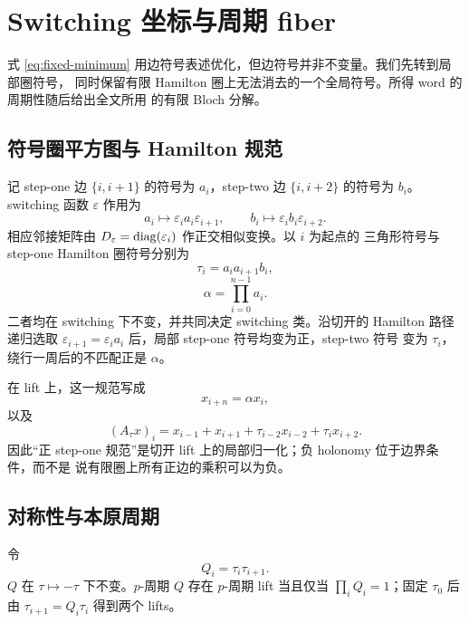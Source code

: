 \section{Switching 坐标与周期 fiber}
\label{sec:gauge}

式 \eqref{eq:fixed-minimum} 用边符号表述优化，但边符号并非不变量。我们先转到局部圈符号，
同时保留有限 Hamilton 圈上无法消去的一个全局符号。所得 word 的周期性随后给出全文所用
的有限 Bloch 分解。

\subsection{符号圈平方图与 Hamilton 规范}

记 step-one 边 $\{i,i+1\}$ 的符号为 $a_i$，step-two 边 $\{i,i+2\}$ 的符号为
$b_i$。switching 函数 $\varepsilon$ 作用为
\[
 a_i\mapsto\varepsilon_i a_i\varepsilon_{i+1},\qquad
 b_i\mapsto\varepsilon_i b_i\varepsilon_{i+2}.
\]
相应邻接矩阵由 $D_\varepsilon=\operatorname{diag}(\varepsilon_i)$ 作正交相似变换。以 $i$ 为起点的
三角形符号与 step-one Hamilton 圈符号分别为
\begin{equation}
 \tau_i=a_ia_{i+1}b_i,
 \label{eq:triangle-flux}
\end{equation}
\begin{equation}
 \alpha=\prod_{i=0}^{n-1}a_i.
 \label{eq:ham-holonomy}
\end{equation}
二者均在 switching 下不变，并共同决定 switching 类。沿切开的 Hamilton 路径递归选取
$\varepsilon_{i+1}=\varepsilon_i a_i$ 后，局部 step-one 符号均变为正，step-two 符号
变为 $\tau_i$，绕行一周后的不匹配正是 $\alpha$。

在 lift 上，这一规范写成
\begin{equation}
 x_{i+n}=\alpha x_i,
 \label{eq:finite-holonomy-boundary}
\end{equation}
以及
\begin{equation}
 (A_\tau x)_i=x_{i-1}+x_{i+1}
   +\tau_{i-2}x_{i-2}+\tau_i x_{i+2}.
 \label{eq:hamilton-operator}
\end{equation}
因此“正 step-one 规范”是切开 lift 上的局部归一化；负 holonomy 位于边界条件，而不是
说有限圈上所有正边的乘积可以为负。

\subsection{对称性与本原周期}
\label{sec:symmetries}

令
\begin{equation}
 Q_i=\tau_i\tau_{i+1}.
 \label{eq:q-word}
\end{equation}
$Q$ 在 $\tau\mapsto-\tau$ 下不变。$p$-周期 $Q$ 存在 $p$-周期 lift 当且仅当
$\prod_iQ_i=1$；固定 $\tau_0$ 后由 $\tau_{i+1}=Q_i\tau_i$ 得到两个 lifts。

